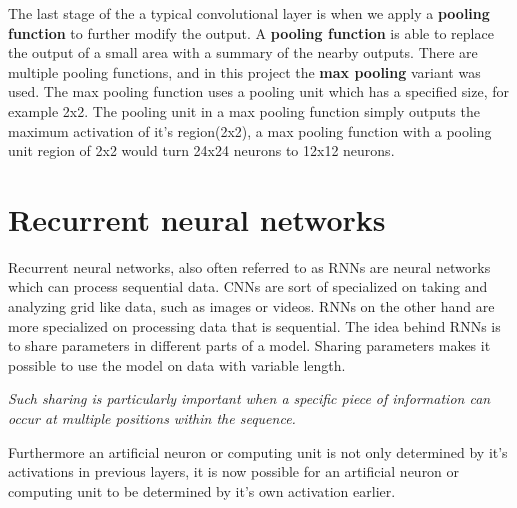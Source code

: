 The last stage of the a typical convolutional layer is when we apply a \textbf{pooling function}\parencite{zhou_computation_1988} to further modify the output. A \textbf{pooling function} is able to replace the output of a small area with a summary of the nearby outputs. There are multiple pooling functions, and in this project the \textbf{max pooling} variant was used. The max pooling function uses a pooling unit which has a specified size, for example 2x2. The pooling unit in a max pooling function simply outputs the maximum activation of it's region(2x2), a max pooling function with a pooling unit region of 2x2 would turn 24x24 neurons to 12x12 neurons. \cite{goodfellow_deep_2016} \cite{nielsen_neural_2015}

\section{Recurrent neural networks}

Recurrent neural networks, also often referred to as RNNs \parencite{rumelhart_learning_1986} are neural networks which can process sequential data. CNNs are sort of specialized on taking and analyzing grid like data, such as images or videos. RNNs on the other hand are more specialized on processing data that is sequential. The idea behind RNNs is to share parameters in different parts of a model. Sharing parameters makes it possible to use the model on data with variable length. \begin{displayquote}
 \textit{Such sharing is particularly important when a specific piece of information can occur at multiple positions within the sequence.}
\end{displayquote}
Furthermore an artificial neuron or computing unit is not only determined by it's activations in previous layers, it is now possible for an artificial neuron or computing unit to be determined by it's own activation earlier. \\ \parencite{goodfellow_deep_2016} \cite{nielsen_neural_2015} \\\\

